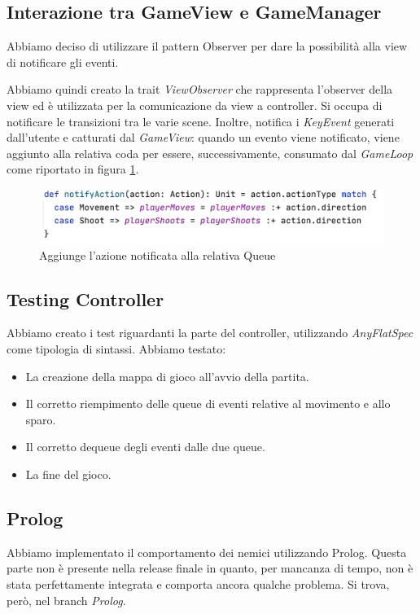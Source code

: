 
    \subsection{Interazione tra GameView e GameManager} 
    Abbiamo deciso di utilizzare il pattern Observer per dare la possibilità alla view di notificare gli eventi.
    
    Abbiamo quindi creato la trait \textit{ViewObserver} che rappresenta l'observer della view ed è utilizzata per la comunicazione da view a controller. 
    Si occupa di notificare le transizioni tra le varie scene.
    Inoltre, notifica i \textit{KeyEvent} generati dall'utente e catturati dal \textit{GameView}: quando un evento viene notificato, viene aggiunto alla relativa coda per essere, successivamente, consumato dal \textit{GameLoop} come riportato in figura \ref{notifyAction}.
    \begin{figure}[H]
    \centering
      \includegraphics[width=13cm]{res/notifyAction.png}
      \caption{Aggiunge l'azione notificata alla relativa Queue}
      \label{notifyAction}
    \end{figure}
    
    \subsection{Testing Controller}
    Abbiamo creato i test riguardanti la parte del controller, utilizzando \textit{AnyFlatSpec} come tipologia di sintassi. 
    Abbiamo testato:
    
    \begin{itemize}
        \item La creazione della mappa di gioco all'avvio della partita.
        \item Il corretto riempimento delle queue di eventi relative al movimento e allo sparo.
        \item Il corretto dequeue degli eventi dalle due queue.
        \item La fine del gioco.
    \end{itemize}
    
    \subsection{Prolog}
    Abbiamo implementato il comportamento dei nemici utilizzando Prolog. Questa parte non è presente nella release finale in quanto, per mancanza di tempo, non è stata perfettamente integrata e comporta ancora qualche problema. Si trova, però, nel branch \textit{Prolog}.
    
